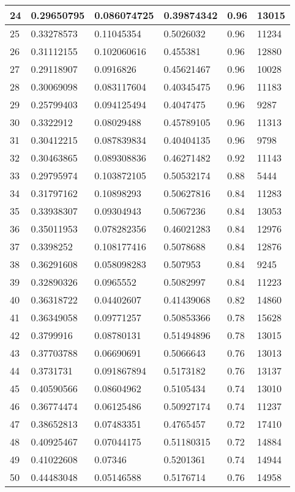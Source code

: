\begin{longtable}{|l|l|l|l|l|l|}
24 & 0.29650795 & 0.086074725 & 0.39874342 & 0.96 & 13015 \\ \hline 
25 & 0.33278573 & 0.11045354 & 0.5026032 & 0.96 & 11234 \\ \hline 
26 & 0.31112155 & 0.102060616 & 0.455381 & 0.96 & 12880 \\ \hline 
27 & 0.29118907 & 0.0916826 & 0.45621467 & 0.96 & 10028 \\ \hline 
28 & 0.30069098 & 0.083117604 & 0.40345475 & 0.96 & 11183 \\ \hline 
29 & 0.25799403 & 0.094125494 & 0.4047475 & 0.96 & 9287 \\ \hline 
30 & 0.3322912 & 0.08029488 & 0.45789105 & 0.96 & 11313 \\ \hline 
31 & 0.30412215 & 0.087839834 & 0.40404135 & 0.96 & 9798 \\ \hline 
32 & 0.30463865 & 0.089308836 & 0.46271482 & 0.92 & 11143 \\ \hline 
33 & 0.29795974 & 0.103872105 & 0.50532174 & 0.88 & 5444 \\ \hline 
34 & 0.31797162 & 0.10898293 & 0.50627816 & 0.84 & 11283 \\ \hline 
35 & 0.33938307 & 0.09304943 & 0.5067236 & 0.84 & 13053 \\ \hline 
36 & 0.35011953 & 0.078282356 & 0.46021283 & 0.84 & 12976 \\ \hline 
37 & 0.3398252 & 0.108177416 & 0.5078688 & 0.84 & 12876 \\ \hline 
38 & 0.36291608 & 0.058098283 & 0.507953 & 0.84 & 9245 \\ \hline 
39 & 0.32890326 & 0.0965552 & 0.5082997 & 0.84 & 11223 \\ \hline 
40 & 0.36318722 & 0.04402607 & 0.41439068 & 0.82 & 14860 \\ \hline 
41 & 0.36349058 & 0.09771257 & 0.50853366 & 0.78 & 15628 \\ \hline 
42 & 0.3799916 & 0.08780131 & 0.51494896 & 0.78 & 13015 \\ \hline 
43 & 0.37703788 & 0.06690691 & 0.5066643 & 0.76 & 13013 \\ \hline 
44 & 0.3731731 & 0.091867894 & 0.5173182 & 0.76 & 13137 \\ \hline 
45 & 0.40590566 & 0.08604962 & 0.5105434 & 0.74 & 13010 \\ \hline 
46 & 0.36774474 & 0.06125486 & 0.50927174 & 0.74 & 11237 \\ \hline 
47 & 0.38652813 & 0.07483351 & 0.4765457 & 0.72 & 17410 \\ \hline 
48 & 0.40925467 & 0.07044175 & 0.51180315 & 0.72 & 14884 \\ \hline 
49 & 0.41022608 & 0.07346 & 0.5201361 & 0.74 & 14944 \\ \hline 
50 & 0.44483048 & 0.05146588 & 0.5176714 & 0.76 & 14958 \\ \hline 
\end{longtable}